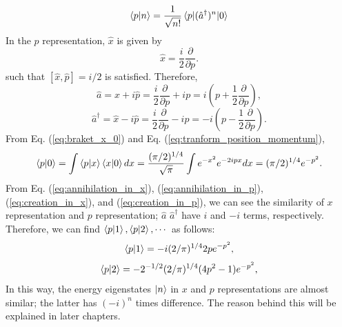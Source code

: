 \begin{equation}
  \begin{aligned}
  	\braket{p|n} = \frac{1}{\sqrt{n!}}\braket{p|(\hat a^\dagger)^n|0}
  \end{aligned}
\end{equation}
In the $p$ representation, $\hat x$ is given by
\begin{equation}
  \hat x = \frac i 2 \frac {\partial}{\partial p}.
\end{equation}
such that $[\hat x, \hat p] = i/2$ is satisfied. Therefore, 
\begin{equation}
  \hat a = \hat x + i\hat p = \frac i 2 \frac{\partial}{\partial p} + ip = i\left( p+\frac{1}{2}\frac{\partial}{\partial p} \right),
  \label{eq:annihilation_in_p}
\end{equation}
\begin{equation}
  \hat a^\dagger = \hat x - i\hat p = \frac i 2 \frac{\partial}{\partial p} - ip = -i \left(p - \frac{1}{2}\frac{\partial}{\partial p} \right).
  \label{eq:creation_in_p}
\end{equation}
From Eq. (\ref{eq:braket_x_0}) and Eq. (\ref{eq:tranform_position_momentum}),
\begin{equation}
  \braket{p|0} = \int\braket{p|x}\braket{x|0}dx = \frac {(\pi/2)^{1/4}} {\sqrt \pi} 
  \int e^{-x^2}e^{-2ipx}dx = (\pi/2)^{1/4}e^{-p^2}.
\end{equation}
From Eq. (\ref{eq:annihilation_in_x}), (\ref{eq:annihilation_in_p}), (\ref{eq:creation_in_x}), and (\ref{eq:creation_in_p}), we can see the similarity of $x$ representation and $p$ representation; $\hat a$ $\hat a^\dagger$ have $i$ and $-i$ terms, respectively.
Therefore, we can find $\braket{p|1}, \braket{p|2}, \cdots$ as follows:
\begin{equation}
  \braket{p|1} = -i(2/\pi)^{1/4}2pe^{-p^2},
\end{equation}
\begin{equation}
  \braket{p|2} = -2^{-1/2}(2/\pi)^{1/4}(4p^2-1)e^{-p^2},
\end{equation}
In this way, the energy eigenstates $\ket n$ in $x$ and $p$ representations are almost similar; the latter has $(-i)^n$ times difference. The reason behind this will be explained in later chapters.

